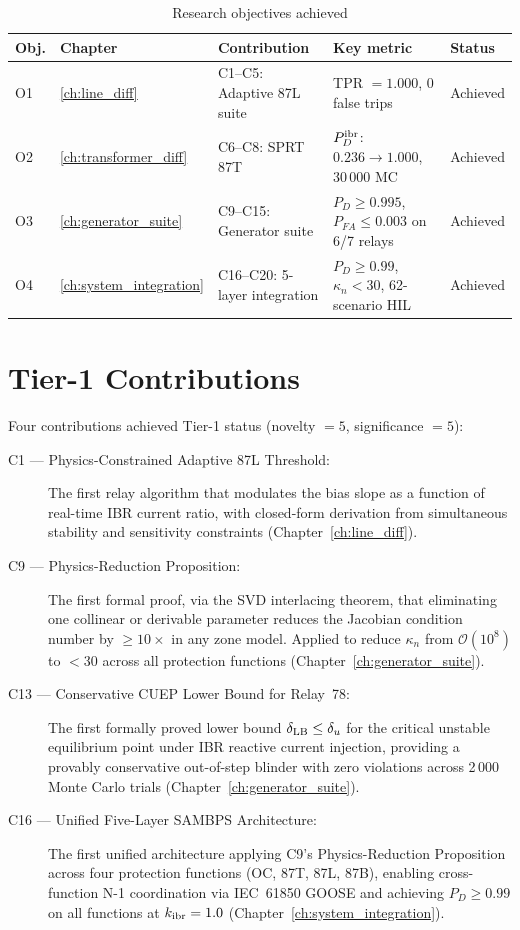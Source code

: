 \begin{table}[htbp]
\caption{Research objectives achieved}
\label{tab:ch10_objectives}
\begin{tabularx}{\textwidth}{@{}lp{2cm}p{3.5cm}p{4cm}X@{}}
\toprule
Obj. & Chapter & Contribution & Key metric & Status \\
\midrule
O1 & \ref{ch:line_diff} & C1--C5: Adaptive 87L suite
  & TPR $= 1.000$, 0 false trips & Achieved \\
O2 & \ref{ch:transformer_diff} & C6--C8: SPRT 87T
  & $P_D^{\rm ibr}$: $0.236 \to 1.000$, 30\,000 MC & Achieved \\
O3 & \ref{ch:generator_suite} & C9--C15: Generator suite
  & $P_D \geq 0.995$, $P_{FA} \leq 0.003$ on 6/7 relays & Achieved \\
O4 & \ref{ch:system_integration} & C16--C20: 5-layer integration
  & $P_D \geq 0.99$, $\kappa_n < 30$, 62-scenario HIL & Achieved \\
\bottomrule
\end{tabularx}
\end{table}

\section{Tier-1 Contributions}
\label{sec:ch10_tier1}

Four contributions achieved Tier-1 status (novelty $= 5$, significance $= 5$):

\begin{description}
\item[C1 — Physics-Constrained Adaptive 87L Threshold:]
  The first relay algorithm that modulates the bias slope as a function
  of real-time IBR current ratio, with closed-form derivation from
  simultaneous stability and sensitivity constraints (Chapter~\ref{ch:line_diff}).

\item[C9 — Physics-Reduction Proposition:]
  The first formal proof, via the SVD interlacing theorem, that eliminating
  one collinear or derivable parameter reduces the Jacobian condition number
  by $\geq 10\times$ in any zone model. Applied to reduce $\kappa_n$ from
  $\mathcal{O}(10^8)$ to $< 30$ across all protection functions
  (Chapter~\ref{ch:generator_suite}).

\item[C13 — Conservative CUEP Lower Bound for Relay~78:]
  The first formally proved lower bound $\delta_{\rm LB} \leq \delta_u$ for
  the critical unstable equilibrium point under IBR reactive current injection,
  providing a provably conservative out-of-step blinder with zero violations
  across 2\,000 Monte Carlo trials (Chapter~\ref{ch:generator_suite}).

\item[C16 — Unified Five-Layer SAMBPS Architecture:]
  The first unified architecture applying C9's Physics-Reduction Proposition
  across four protection functions (OC, 87T, 87L, 87B), enabling
  cross-function N-1 coordination via IEC~61850 GOOSE and achieving
  $P_D \geq 0.99$ on all functions at $k_{\rm ibr} = 1.0$
  (Chapter~\ref{ch:system_integration}).
\end{description}

